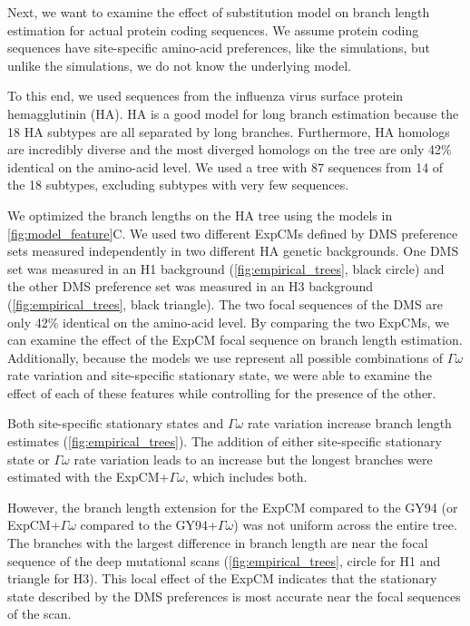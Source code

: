 \documentclass[11pt]{article}
\begin{document}
Next, we want to examine the effect of substitution model on branch length estimation for actual protein coding sequences. 
We assume protein coding sequences have site-specific amino-acid preferences, like the simulations, but unlike the simulations, we do not know the underlying model.

To this end, we used sequences from the influenza virus surface protein hemagglutinin (HA). 
HA is a good model for long branch estimation because the 18 HA subtypes are all separated by long branches. 
Furthermore, HA homologs are incredibly diverse and the most diverged homologs on the tree are only 42\% identical on the amino-acid level. 
We used a tree with 87 sequences from 14 of the 18 subtypes, excluding subtypes with very few sequences. 

We optimized the branch lengths on the HA tree using the models in \ref{fig:model_feature}C. 
We used two different ExpCMs defined by DMS preference sets measured independently in two different HA genetic backgrounds. 
One DMS set was measured in an H1 background (\ref{fig:empirical_trees}, black circle) and the other DMS preference set was measured in an H3 background (\ref{fig:empirical_trees}, black triangle). 
The two focal sequences of the DMS are only 42\% identical on the amino-acid level. 
By comparing the two ExpCMs, we can examine the effect of the ExpCM focal sequence on branch length estimation. 
Additionally, because the models we use represent all possible combinations of $\Gamma\omega$ rate variation and site-specific stationary state, we were able to examine the effect of each of these features while controlling for the presence of the other. 

Both site-specific stationary states and $\Gamma\omega$ rate variation increase branch length estimates (\ref{fig:empirical_trees}). 
The addition of either site-specific stationary state or $\Gamma\omega$ rate variation leads to an increase but the longest branches were estimated with the ExpCM+$\Gamma\omega$, which includes both. 

However, the branch length extension for the ExpCM compared to the GY94 (or ExpCM+$\Gamma\omega$ compared to the GY94+$\Gamma\omega$) was not uniform across the entire tree. 
The branches with the largest difference in branch length are near the focal sequence of the deep mutational scans (\ref{fig:empirical_trees}, circle for H1 and triangle for H3). 
This local effect of the ExpCM indicates that the stationary state described by the DMS preferences is most accurate near the focal sequences of the scan. 
\end{document}
